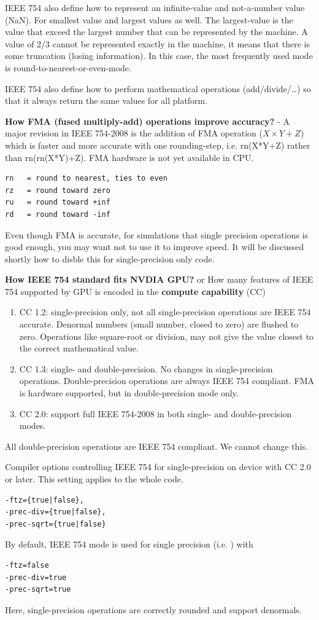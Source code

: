 IEEE 754 also define how to represent an infinite-value and not-a-number value
(NaN). For smallest value and largest values as well. The largest-value is the
value that exceed the largest number that can be represented by the machine. A
value of 2/3 cannot be represented exactly in the machine, it means that there
is some truncation (losing information). In this case, the most frequently used
mode is round-to-nearest-or-even-mode.

IEEE 754 also define how to perform mathematical operations (add/divide/\ldots)
so that it always return the same values for all platform. 

{\bf How FMA (fused multiply-add) operations improve accuracy?} -  A major
revision in IEEE 754-2008 is the addition of FMA operation ($X\times Y+Z$) which
is faster and more accurate with one rounding-step, i.e. rn(X*Y+Z) rather than
rn(rn(X*Y)+Z). FMA hardware is not yet available in CPU. 
\begin{verbatim}
rn   = round to nearest, ties to even
rz   = round toward zero
ru   = round toward +inf
rd   = round toward -inf
\end{verbatim}
Even though FMA is accurate, for simulations that single precision operations is
good enough, you may want not to use it to improve speed. It will be discussed
shortly how to disble this for single-precision only code. 

{\bf How IEEE 754 standard fits NVDIA GPU?} or
How many features of IEEE 754 supported by GPU is encoded in the {\bf
compute capability} (CC)
\begin{enumerate}
  \item CC 1.2: single-precision only, not all single-precision operations are
  IEEE 754 accurate. Denormal numbers (small number, closed to zero) are flushed
  to zero. Operations like square-root or division, may not give the value
  closest to the correct mathematical value.
  \item CC 1.3: single- and double-precision. No changes in
  single-precision operations. Double-precision operations are always IEEE 754
  compliant. FMA is hardware supported, but in double-precision mode only.
  
  \item CC 2.0: support full IEEE 754-2008 in both single- and double-precision
  modes.
\end{enumerate}
All double-precision operations are IEEE 754 compliant. We cannot change this. 

Compiler options controlling IEEE 754 for single-precision on device with CC
2.0 or later. This setting applies to the whole code. 
\begin{verbatim}
-ftz={true|false},
-prec-div={true|false},
-prec-sqrt={true|false}
\end{verbatim}
By default, IEEE 754 mode is used for single precision (i.e. ) with
\begin{verbatim}
-ftz=false
-prec-div=true
-prec-sqrt=true
\end{verbatim}
Here, single-precision operations are correctly rounded and support denormals. 

